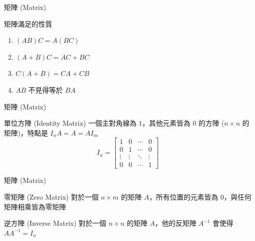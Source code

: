\documentclass[aspectratio=169]{beamer}
\begin{document}
\begin{frame}{矩陣 (Matrix)}
    \begin{alertblock}{矩陣滿足的性質}
        \begin{enumerate}
            \item $(AB)C = A(BC)$
            \item $(A+B)C = AC + BC$
            \item $C(A+B) = CA + CB$
            \item $AB$ 不見得等於 $BA$
        \end{enumerate}
    \end{alertblock}
\end{frame}

\begin{frame}{矩陣 (Matrix)}
    \begin{alertblock}{單位方陣 (Identity Matrix)}
        一個主對角線為 $1$，其他元素皆為 $0$ 的方陣 ($n \times n$ 的矩陣)，特點是 $I_nA = A = AI_m$
        $$I_{n}={\begin{bmatrix}1&0&\cdots &0\\0&1&\cdots &0\\\vdots &\vdots &\ddots &\vdots \\0&0&\cdots &1\end{bmatrix}}$$
    \end{alertblock}
\end{frame}

\begin{frame}{矩陣 (Matrix)}
    \begin{alertblock}{零矩陣 (Zero Matrix)}
        對於一個 $n \times m$ 的矩陣 $A$，所有位置的元素皆為 $0$，與任何矩陣相乘皆為零矩陣
    \end{alertblock}
    \begin{alertblock}{逆方陣 (Inverse Matrix)}
        對於一個 $n \times n$ 的矩陣 $A$，他的反矩陣 $A^{-1}$ 會使得 $AA^{-1} = I_n$
    \end{alertblock}
\end{frame}
\end{document}
